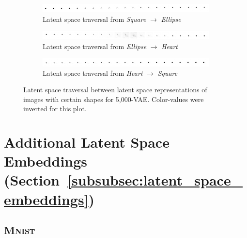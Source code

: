 \documentclass[11pt]{article}
\let\oldsection\section
\renewcommand\section{\clearpage\oldsection}
\begin{document}
\begin{figure}[H]
\centering
\begin{subfigure}{\textwidth}
\centering
\includegraphics[width=\textwidth]{images/latent_space_entanglement/vae_5000_traverse_square_ellipse.png}
\caption{Latent space traversal from \textit{Square} $\rightarrow$ \textit{Ellipse}}
\end{subfigure}
\begin{subfigure}{\textwidth}
\centering
\includegraphics[width=\textwidth]{images/latent_space_entanglement/vae_5000_traverse_ellipse_heart.png}
\caption{Latent space traversal from \textit{Ellipse} $\rightarrow$ \textit{Heart}}
\end{subfigure}
\begin{subfigure}{\textwidth}
\centering
\includegraphics[width=\textwidth]{images/latent_space_entanglement/vae_5000_traverse_heart_square.png}
\caption{Latent space traversal from \textit{Heart} $\rightarrow$ \textit{Square}}
\label{subfig:10000_vae_latent_space_traversal_heart_to_square}
\end{subfigure}
\caption{Latent space traversal between latent space representations of images with certain shapes for 5,000-\ac{VAE}. Color-values were inverted for this plot.}
\label{fig:5000_vae_latent_space_traversal_shape_to_shape}
\end{figure}


\pagebreak
\section{Additional Latent Space Embeddings (Section~\ref{subsubsec:latent_space_embeddings})}

\subsection{\textsc{Mnist}}
\end{document}
